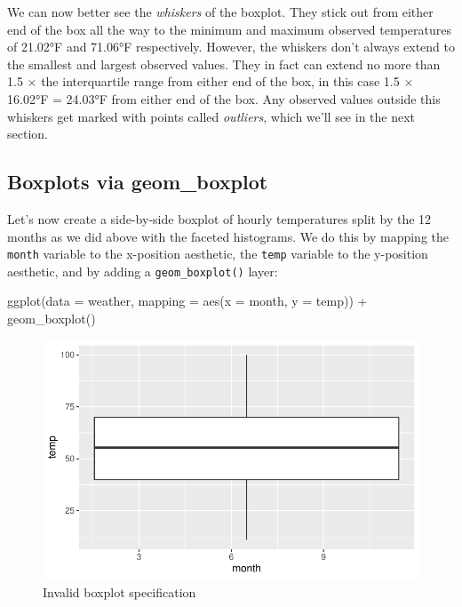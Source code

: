 \documentclass[
  letterpaper,
  DIV=11,
  numbers=noendperiod]{scrreprt}
\newenvironment{Shaded}{\begin{snugshade}}{\end{snugshade}}
\newcommand{\AttributeTok}[1]{\textcolor[rgb]{0.40,0.45,0.13}{#1}}
\newcommand{\FunctionTok}[1]{\textcolor[rgb]{0.28,0.35,0.67}{#1}}
\newcommand{\NormalTok}[1]{\textcolor[rgb]{0.00,0.23,0.31}{#1}}
\newcommand{\SpecialCharTok}[1]{\textcolor[rgb]{0.37,0.37,0.37}{#1}}
\theoremstyle{definition}
\theoremstyle{remark}
\begin{document}
We can now better see the \emph{whiskers} of the boxplot. They stick out
from either end of the box all the way to the minimum and maximum
observed temperatures of 21.02°F and 71.06°F respectively. However, the
whiskers don't always extend to the smallest and largest observed
values. They in fact can extend no more than 1.5 \(\times\) the
interquartile range from either end of the box, in this case 1.5
\(\times\) 16.02°F = 24.03°F from either end of the box. Any observed
values outside this whiskers get marked with points called
\emph{outliers}, which we'll see in the next section.

\hypertarget{sec-geomboxplot}{%
\subsection{Boxplots via geom\_boxplot}\label{sec-geomboxplot}}

Let's now create a side-by-side boxplot of hourly temperatures split by
the 12 months as we did above with the faceted histograms. We do this by
mapping the \texttt{month} variable to the x-position aesthetic, the
\texttt{temp} variable to the y-position aesthetic, and by adding a
\texttt{geom\_boxplot()} layer:

\begin{Shaded}
\begin{Highlighting}[]
\FunctionTok{ggplot}\NormalTok{(}\AttributeTok{data =}\NormalTok{ weather, }\AttributeTok{mapping =} \FunctionTok{aes}\NormalTok{(}\AttributeTok{x =}\NormalTok{ month, }\AttributeTok{y =}\NormalTok{ temp)) }\SpecialCharTok{+}
  \FunctionTok{geom\_boxplot}\NormalTok{()}
\end{Highlighting}
\end{Shaded}

\begin{figure}[H]

{\centering \includegraphics{02-visualization_files/figure-pdf/fig-badbox-1.pdf}

}

\caption{\label{fig-badbox}Invalid boxplot specification}

\end{figure}
\end{document}
